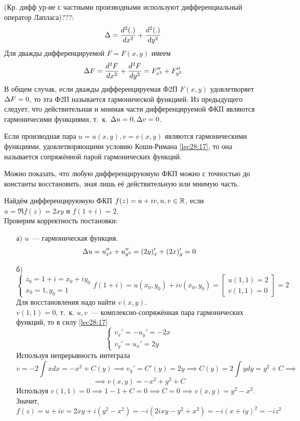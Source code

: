 \documentclass[../../main.tex]{subfiles}
\begin{document}
(Кр. дифф ур-ие с частными производными используют дифференциальный оператор Лапласа)???:
\[
\Delta = \dfrac{d^2 (.)}{d x^2} + \dfrac{d^2(.)}{d y^2}
\]
Для дважды дифференцируемой $ F = F(x, y) $ имеем\[
\Delta F = \dfrac{d^2 F}{d x^2} + \dfrac{d^2 F}{d y^2} = 
F_{x^2}'' + F_{y^2}''
\]
В общем случак, если дважды дифференцируемая Ф2П $ F(x, y) $
удовлетворяет $ \Delta F = 0 $, то эта Ф2П называется гармонической функцией.
Из предыдущего следует, что действительная и мнимая части 
дифференцируемой ФКП являются гармоничесими функциями, т.~к.
$ \Delta u = 0, \Delta v = 0 $.

Если производная пара $ u = u(x, y), v = v(x, y) $ являются гармоническими функциями, 
удовлетворяющими условию Коши-Римана \eqref{lec28:17},
то она называется сопряжённой парой гармонических функций.

Можно показать, что любую дифференцируюмую ФКП можно с точностью до константы 
восстановить, зная лишь её действительную или мнимую часть.
\begin{exmp}
Найдём дифференцируюмую ФКП $ f(z) = u + iv, u, v\in \mathbb{R} $,
если $ u = \Re f(z) = 2xy $ и $ f(1 + i) = 2 $.\\
Проверим корректность постановки:
\begin{enumerate}
	\item[а)] $ u $~--- гармоническая функция.
	\[\Delta u = u_{x^2}'' + u_{y^2}'' = (2y)_x' + (2x)_y' = 0 \]
	\item[б)] \[
	\begin{cases}
		z_0 = 1 + i = x_0 + iy_0\\
		x_0 = 1, y_0 = 1
	\end{cases}
	f(1 + i) = u(x_0, y_0) + iv(x_0, y_0) = \left[
	\begin{gathered}
		u(1, 1) = 2\\
		v(1, 1) = 0
	\end{gathered}
	\right] = 2
	\]
	Для восстановления надо найти $ v(x, y) $.\\
	$ v(1, 1) = 0 $, т.~к. $ u, v $~--- комплексно-сопряжённая пара
	гармонических функций, то в силу \eqref{lec28:17}
	\[
	\begin{cases}
		v_x' = -u_y' = -2x\\
		v_y' = u_x' = 2y
	\end{cases}
	\]
	Используя непрерывность интеграла \[ 
	v = -2\int x dx = -x^2 + C(y) 
	\implies v_y' = C'(y) = 2y \implies 
	C(y) = 2\int y dy = y^2 + C \implies \]\[ \implies
	v(x, y) = -x^2 + y^2 + C
	\]
	Используя $ v(1, 1) = 0 \implies 1 - 1 + C = 0 \implies C = 0 \implies 
	v(x, y) = y^2 - x^2
	$. Значит, $ f(z) = u + iv = 2xy + i(y^2 - x^2) =
	-i(2ixy - y^2 + x^2) = -i(x + iy)^2 = -iz^2
	$
\end{enumerate}
\end{exmp}
\end{document}

